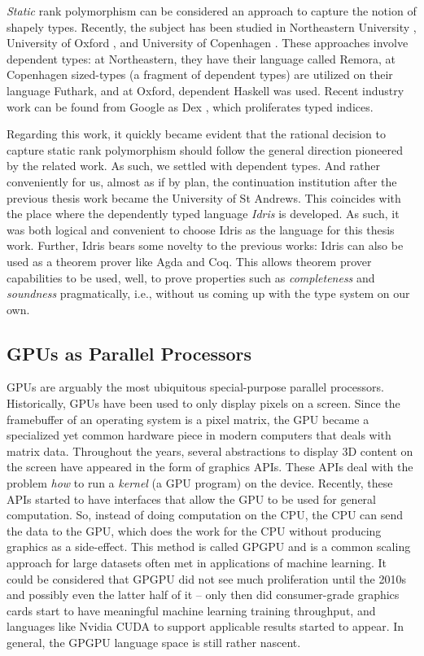 \documentclass{report}
\begin{document}
\emph{Static} rank polymorphism can be considered an approach to capture the notion of shapely types. Recently, the subject has been studied in Northeastern University \cite{slepak2014array, slepak2019semantics, shivers2019introduction}, University of Oxford \cite{gibbons2017aplicative}, and University of Copenhagen \cite{henriksen:phdthesis}. These approaches involve dependent types: at Northeastern, they have their language called Remora, at Copenhagen sized-types (a fragment of dependent types) are utilized on their language Futhark, and at Oxford, dependent Haskell was used. Recent industry work can be found from Google as Dex \cite{paszke2021getting}, which proliferates typed indices.

Regarding this work, it quickly became evident that the rational decision to capture static rank polymorphism should follow the general direction pioneered by the related work. As such, we settled with dependent types. And rather conveniently for us, almost as if by plan, the continuation institution after the previous thesis work became the University of St Andrews. This coincides with the place where the dependently typed language \emph{Idris} is developed. As such, it was both logical and convenient to choose Idris as the language for this thesis work. Further, Idris bears some novelty to the previous works: Idris can also be used as a theorem prover like Agda and Coq. This allows theorem prover capabilities to be used, well, to prove properties such as \emph{completeness} and \emph{soundness} pragmatically, i.e., without us coming up with the type system on our own. 

\subsection{GPUs as Parallel Processors}

GPUs are arguably the most ubiquitous special-purpose parallel processors. Historically, GPUs have been used to only display pixels on a screen. Since the framebuffer of an operating system is a pixel matrix, the GPU became a specialized yet common hardware piece in modern computers that deals with matrix data. Throughout the years, several abstractions to display 3D content on the screen have appeared in the form of graphics \glspl{API}. These APIs deal with the problem \emph{how} to run a \emph{kernel} (a GPU program) on the device. Recently, these APIs started to have interfaces that allow the GPU to be used for general computation. So, instead of doing computation on the CPU, the CPU can send the data to the GPU, which does the work for the CPU without producing graphics as a side-effect. This method is called \gls{GPGPU} and is a common scaling approach for large datasets often met in applications of machine learning. It could be considered that GPGPU did not see much proliferation until the 2010s and possibly even the latter half of it -- only then did consumer-grade graphics cards start to have meaningful machine learning training throughput, and languages like Nvidia CUDA to support applicable results started to appear. In general, the GPGPU language space is still rather nascent.
\end{document}
